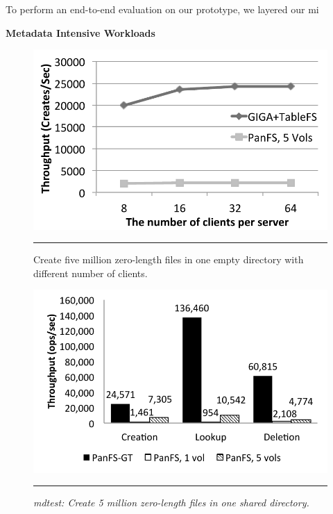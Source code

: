 To perform an end-to-end evaluation on our prototype,
we layered our mi

\textbf{Metadata Intensive Workloads}

\begin{figure}[t]  %
\centerline{\includegraphics[scale=0.5]{./figs/zero_file_creation_on_panfs}}
\vspace{10pt}
\caption{\normalsize
Create five million zero-length files in one empty directory
with different number of clients.
\textit{}
}
\vspace{10pt}
\hrule
\label{graph:ldb-singlenode}
\end{figure}       %

\begin{figure}[t]  %
\centerline{\includegraphics[scale=0.6]{./figs/mdtest}}
\vspace{10pt}
\caption{\normalsize
\textit{mdtest:
Create 5 million zero-length files in one shared directory.
}
}
\vspace{10pt}
\hrule
\label{graph:ldb-singlenode}
\end{figure}       %



